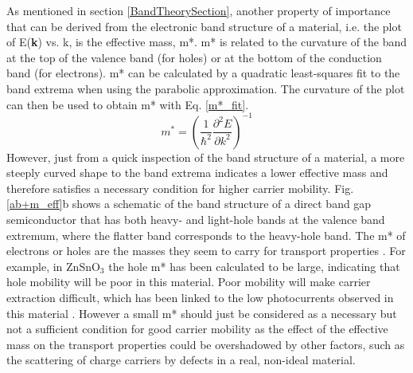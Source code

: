 \documentclass[11pt, twoside]{report}
\begin{document}
As mentioned in section \ref{BandTheorySection}, another property of importance that can be derived from the electronic band structure of a material, i.e. the plot of E(\textbf{k}) vs. k, is the effective mass, m*. m* is related to the curvature of the band at the top of the valence band (for holes) or at the bottom of the conduction band (for electrons). m* can be calculated by a quadratic least-squares fit to the band extrema when using the parabolic approximation. The curvature of the plot can then be used to obtain m* with Eq. \ref{m*_fit}.
\begin{equation}\label{m*_fit}
m^* = \left( \frac{1}{\hbar^2}\frac{\partial^2 E}{\partial k^2} \right)^{-1}
\end{equation}
However, just from a quick inspection of the band structure of a material, a more steeply curved shape to the band extrema indicates a lower effective mass and therefore satisfies a necessary condition for higher carrier mobility. Fig. \ref{ab+m_eff}b shows a schematic of the band structure of a direct band gap semiconductor that has both heavy- and light-hole bands at the valence band extremum, where the flatter band corresponds to the heavy-hole band.
The m* of electrons or holes are the masses they seem to carry for transport properties \cite{dielectric_const1}. For example, in ZnSnO$_3$ the hole m* has been calculated to be large, indicating that hole mobility will be poor in this material. Poor mobility will make carrier extraction difficult, which has been linked to the low photocurrents observed in this material \cite{effective_mass1}.
However a small m* should just be considered as a necessary but not a sufficient condition for good carrier mobility as the effect of the effective mass on the transport properties could be overshadowed by other factors, such as the scattering of charge carriers by defects in a real, non-ideal material. 
\end{document}
